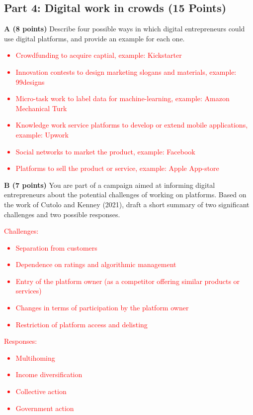 \documentclass[12pt]{scrartcl}
\begin{document}
\subsection*{Part 4: Digital work in crowds (15 Points)}

\textbf{A (8 points)} Describe four possible ways in which digital entrepreneurs could use digital platforms, and provide an example for each one.

\textcolor{red}{
	\begin{itemize}
		\item Crowdfunding to acquire captial, example: Kickstarter
		\item Innovation contests to design marketing slogans and materials, example: 99designs
		\item  Micro-task work to label data for machine-learning, example: Amazon Mechanical Turk
		\item Knowledge work service platforms to develop or extend mobile applications, example: Upwork
		\item Social networks to market the product, example: Facebook
		\item Platforms to sell the product or service, example: Apple App-store
	\end{itemize}
}


\vspace{0.3cm}
\newpage
\textbf{B (7 points)} You are part of a campaign aimed at informing digital entrepreneurs about the potential challenges of working on platforms. Based on the work of Cutolo and Kenney (2021), draft a short summary of two significant challenges and two possible responses.


\textcolor{red}{
	Challenges:
	\begin{itemize}
		\item Separation from customers
		\item Dependence on ratings and algorithmic management
		\item Entry of the platform owner (as a competitor offering similar products or services)
		\item Changes in terms of participation by the platform owner
		\item Restriction of platform access and delisting
	\end{itemize}
	Responses:
	\begin{itemize}
	\item Multihoming
	\item Income diversification
	\item Collective action
	\item Government action
	\end{itemize}
}
\end{document}
